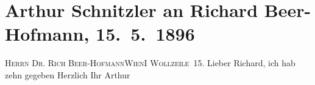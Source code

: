 

         
         \renewcommand{\erwaehntePersonen}{Personen: Richard Beer-Hofmann}
         \renewcommand{\erwaehnteOrte}{Orte: I., Innere Stadt, VIII., Josefstadt, Wien, Wollzeile}
         \renewcommand{\erwaehnteWerke}{}
               \section[Arthur Schnitzler an Richard Beer-Hofmann, 15. 5. 1896]{ Arthur Schnitzler an Richard Beer-Hofmann,
               15. 5. 1896}\nopagebreak{}\rehead{ }\begin{ledgroupsized}[t]{13cm}\normalsize\beginnumbering \toendnotes[C]{\smallbreak\pagebreak[2]} 
\pstart{}{\pb}\textsc{Herrn Dr. Rich Beer-Hofmann}\pend{}\pstart{}\textsc{Wien}\pend{}\pstart{}\textsc{I Wollzeile 15}.\pend{}{\bigskip}\pstart
           \noindent{}{\pb}Lieber Richard, ich hab zehn gegeben\pend
           \pstart Herzlich Ihr \spacefill\mbox{Arthur}\pend{}
         
         \endnumbering{}\end{ledgroupsized}  \newcommand{\dateiname}{L00544}\newcommand{\titel}{Arthur Schnitzler an Richard Beer-Hofmann, 15. 5. 1896}\newcommand{\editorInnen}{Martin Anton Müller und Gerd-Hermann Susen}
      